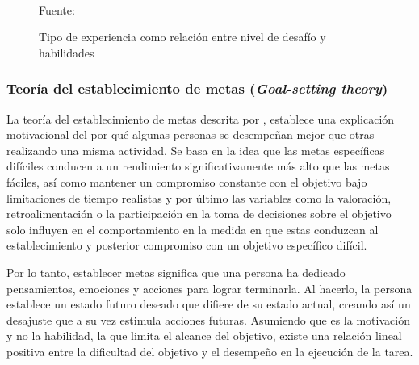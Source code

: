 \begin{figure}[ht]
\caption{Tipo de experiencia como relación entre nivel de desafío y habilidades}
\label{img:tflow}
\centering
{}
\\
{\footnotesize Fuente: }
\end{figure}

\subsubsection{Teoría del establecimiento de metas (\textit{Goal-setting theory})}

La teoría del establecimiento de metas descrita por , establece una explicación motivacional
del por qué algunas personas se desempeñan mejor que otras realizando una misma actividad. Se basa en la idea
que las metas específicas difíciles conducen a un rendimiento significativamente más alto que las metas 
fáciles, así como mantener un compromiso constante con el objetivo bajo limitaciones de tiempo realistas y por
último las variables como la valoración, retroalimentación o la participación en la toma de decisiones sobre 
el objetivo solo influyen en el comportamiento en la medida en que estas conduzcan al establecimiento y 
posterior compromiso con un objetivo específico difícil.

Por lo tanto, establecer metas significa que una persona ha dedicado pensamientos, emociones y acciones para 
lograr terminarla. Al hacerlo, la persona establece un estado futuro deseado que difiere de su estado actual, 
creando así un desajuste que a su vez estimula acciones futuras. Asumiendo que es la motivación y no la 
habilidad, la que limita el alcance del objetivo, existe una relación lineal positiva entre la dificultad del 
objetivo y el desempeño en la ejecución de la tarea.

